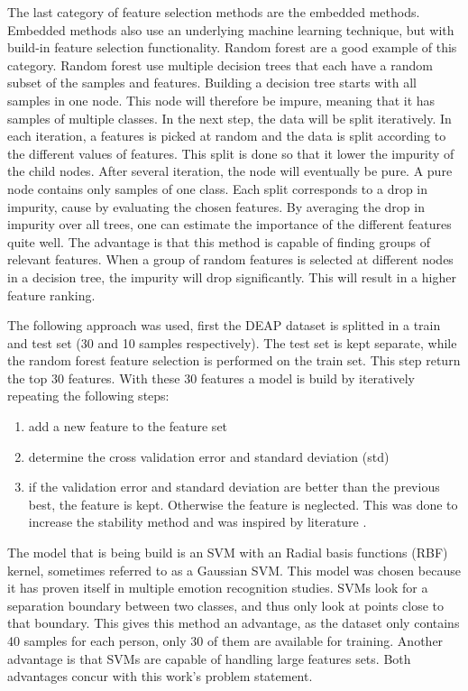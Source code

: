 \documentclass[12pt,journal,compsoc]{IEEEtran}
\newcommand{\npar}{\par \vspace{2.3ex plus 0.3ex minus 0.3ex}}
\begin{document}
The last category of feature selection methods are the embedded methods. Embedded methods also use an underlying machine learning technique, but with build-in feature selection functionality. Random forest are a good example of this category. Random forest use multiple decision trees that each have a random subset of the samples and features\citep{rfPaper}. Building a decision tree starts with all samples in one node. This node will therefore be impure, meaning that it has samples of multiple classes. In the next step, the data will be split iteratively. In each iteration, a features is picked at random and the data is split according to the different values of features. This split is done so that it lower the impurity of the child nodes. After several iteration, the node will eventually be pure. A pure node contains only samples of one class. Each split corresponds to a drop in impurity, cause by evaluating the chosen features. By averaging the drop in impurity over all trees, one can estimate the importance of the different features quite well. The advantage is that this method is capable of finding groups of relevant features. When a group of random features is selected at different nodes in a decision tree, the impurity will drop significantly. This will result in a higher feature ranking.

\npar

The following approach was used, first the DEAP dataset is splitted in a train and test set (30 and 10 samples respectively). The test set is kept separate, while the random forest feature selection is performed on the train set. This step return the top 30 features. With these 30 features a model is build by iteratively repeating the following steps:
\begin{enumerate}
\item add a new feature to the feature set
\item determine the cross validation error and standard deviation (std)
\item if the validation error and standard deviation are better than the previous best, the feature is kept. Otherwise the feature is neglected. This was done to increase the stability method and was inspired by literature \citep{rfPaper}.
\end{enumerate}
The model that is being build is an SVM with an Radial basis functions (RBF) kernel, sometimes referred to as a Gaussian SVM. This model was chosen because it has proven itself in multiple emotion recognition studies\citep{killyPaper,emorecoghard,SVMUsage,SVMUsage2}. SVMs look for a separation boundary between two classes, and thus only look at points close to that boundary. This gives this method an advantage, as the dataset only contains 40 samples for each person, only 30 of them are available for training. Another advantage is that SVMs are capable of handling large features sets\citep{SVMLargeFeatSets,SVMLargeFeatSets2}. Both advantages concur with this work's problem statement. 
\end{document}
